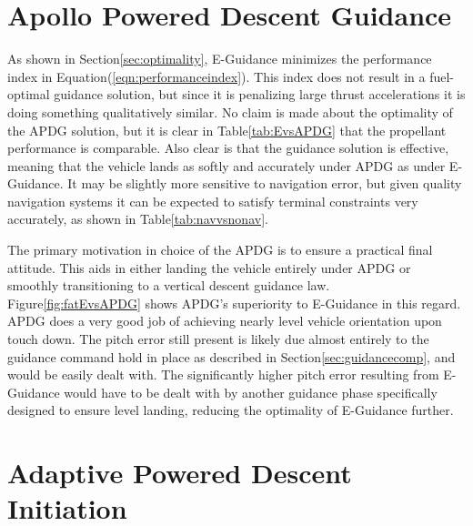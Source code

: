 \section{Apollo Powered Descent Guidance}

As shown in Section\:\ref{sec:optimality}, E-Guidance minimizes the performance index in Equation\:(\ref{eqn:performanceindex}). This index does not result in a fuel-optimal guidance solution, but since it is penalizing large thrust accelerations it is doing something qualitatively similar. No claim is made about the optimality of the APDG solution, but it is clear in Table\:\ref{tab:EvsAPDG} that the propellant performance is comparable. Also clear is that the guidance solution is effective, meaning that the vehicle lands as softly and accurately under APDG as under E-Guidance. It may be slightly more sensitive to navigation error, but given quality navigation systems it can be expected to satisfy terminal constraints very accurately, as shown in Table\:\ref{tab:navvsnonav}.

The primary motivation in choice of the APDG is to ensure a practical final attitude. This aids in either landing the vehicle entirely under APDG or smoothly transitioning to a vertical descent guidance law. Figure\:\ref{fig:fatEvsAPDG} shows APDG's superiority to E-Guidance in this regard. APDG does a very good job of achieving nearly level vehicle orientation upon touch down. The pitch error still present is likely due almost entirely to the guidance command hold in place as described in Section\:\ref{sec:guidancecomp}, and would be easily dealt with. The significantly higher pitch error resulting from E-Guidance would have to be dealt with by another guidance phase specifically designed to ensure level landing, reducing the optimality of E-Guidance further.

\section{Adaptive Powered Descent Initiation} \label{sec:PDIdisc}

